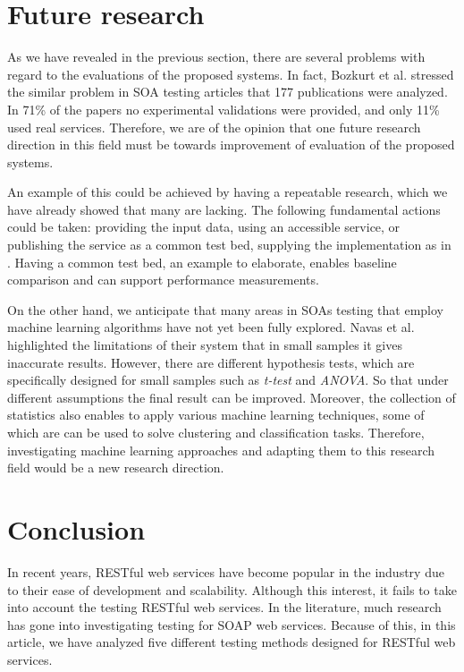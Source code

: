 \documentclass[english]{tktltiki}
\begin{document}
\section{Future research}
As we have revealed in the previous section, there are several problems with regard to the evaluations of the proposed systems. In fact, Bozkurt et al. \cite{bozkurt2013testing} stressed the similar problem in SOA testing articles that 177 publications were analyzed. In 71\% of the papers no experimental validations were provided, and only 11\% used real services. Therefore, we are of the opinion that one future research direction in this field must be towards improvement of evaluation of the proposed systems.

An example of this could be achieved by having a repeatable research, which we have already showed that many are lacking. The following fundamental actions could be taken: providing the input data, using an accessible service, or publishing the service as a common test bed, supplying the implementation as in \cite{arcuri2017restful}. Having a common test bed, an example to elaborate, enables baseline comparison and can support performance measurements.

On the other hand, we anticipate that many areas in SOAs testing that employ machine learning algorithms have not yet been fully explored. Navas et al. \cite{navas2014rest} highlighted the limitations of their system that in small samples it gives inaccurate results. However, there are different hypothesis tests, which are specifically designed for small samples such as \textit{t-test} and \textit{ANOVA}. So that under different assumptions the final result can be improved. Moreover, the collection of statistics also enables to apply various machine learning techniques, some of which are can be used to solve clustering and classification tasks. Therefore, investigating machine learning approaches and adapting them to this research field would be a new research direction.

\section{Conclusion}
In recent years, RESTful web services have become popular in the industry due to their ease of development and scalability. Although this interest, it fails to take into account the testing RESTful web services. In the literature, much research has gone into investigating testing for SOAP web services. Because of this, in this article, we have analyzed five different testing methods designed for RESTful web services.
\end{document}
